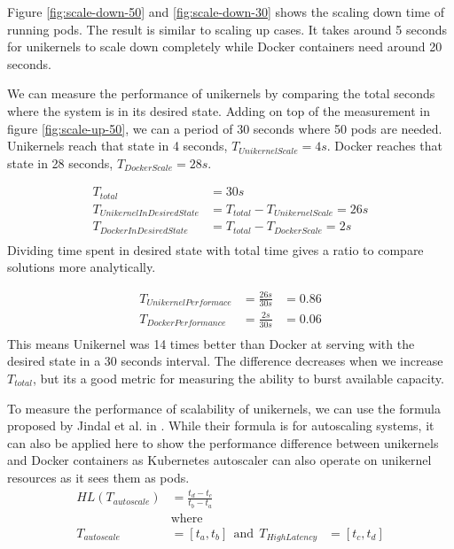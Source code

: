 Figure \ref{fig:scale-down-50} and \ref{fig:scale-down-30} shows the scaling down time of running pods. The result is similar to scaling up cases. It takes around 5 seconds for unikernels to scale down completely while Docker containers need around 20 seconds.

We can measure the performance of unikernels by comparing the total seconds where the system is in its desired state. Adding on top of the measurement in figure \ref{fig:scale-up-50}, we can a period of 30 seconds where 50 pods are needed. Unikernels reach that state in 4 seconds, \(T_{UnikernelScale}=4s\). Docker reaches that state in 28 seconds, \(T_{DockerScale}=28s\).

\begin{equation*}
  \begin{aligned}
    T_{total}&=30s \\
    T_{UnikernelInDesiredState}&=T_{total}-T_{UnikernelScale}=26s \\
    T_{DockerInDesiredState}&=T_{total}-T_{DockerScale}=2s\\
  \end{aligned}
\end{equation*}
Dividing time spent in desired state with total time gives a ratio to compare solutions more analytically.

\begin{equation*}
  \begin{aligned}
    T_{UnikernelPerformace}&=\frac{26s}{30s}&=0.86 \\
    T_{DockerPerformance}&=\frac{2s}{30s}&=0.06 \\
  \end{aligned}
  \end{equation*}
This means Unikernel was 14 times better than Docker at serving with the desired state in a 30 seconds interval. The difference decreases when we increase \(T_{total}\), but its a good metric for measuring the ability to burst available capacity.

  \iffalse
To measure the performance of scalability of unikernels, we can use the formula proposed by Jindal et al. in \cite{multilayered}. While their formula is for autoscaling systems, it can also be applied here to show the performance difference between unikernels and Docker containers as Kubernetes autoscaler can also operate on unikernel resources as it sees them as pods.
\begin{equation*}
  \begin{aligned}
  HL(T_{autoscale})&=\frac{t_d-t_c}{t_b-t_a} \\
  &\textrm{where} \\ 
  T_{autoscale}&=[t_a,t_b] \ \ \textrm{and} \ \ T_{HighLatency}&=[t_c,t_d]
  \end{aligned}
\end{equation*}

